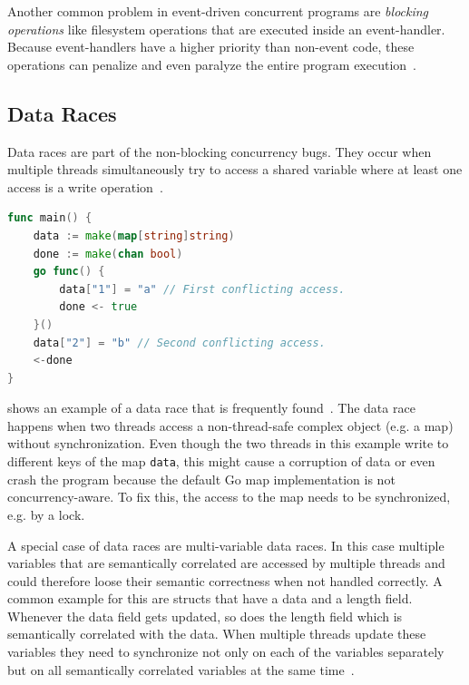 \documentclass[conference]{IEEEtran}
\begin{document}
Another common problem in event-driven concurrent programs are \emph{blocking operations} like filesystem operations that are executed inside an event-handler.
Because event-handlers have a higher priority than non-event code, these operations can penalize and even paralyze the entire program execution~\cite{tchamgoue2012testing}.

\subsection{Data Races}

Data races are part of the non-blocking concurrency bugs.
They occur when multiple threads simultaneously try to access a shared variable where at least one access is a write operation~\cite{serebry2009threadsanitizer}.

\begin{lstlisting}[float=h, language=Go, label=lst:race, caption=Data race by concurrently accessing a map]
func main() {
	data := make(map[string]string)
	done := make(chan bool)
	go func() {
		data["1"] = "a" // First conflicting access.
		done <- true
	}()
	data["2"] = "b" // Second conflicting access.
	<-done
}
\end{lstlisting}

 shows an example of a data race that is frequently found~\cite{serebry2009threadsanitizer}.
The data race happens when two threads access a non-thread-safe complex object (e.g. a map) without synchronization.
Even though the two threads in this example write to different keys of the map \lstinline{data}, this might cause a corruption of data or even crash the program because the default Go map implementation is not concurrency-aware.
To fix this, the access to the map needs to be synchronized, e.g. by a lock.

A special case of data races are multi-variable data races.
In this case multiple variables that are semantically correlated are accessed by multiple threads and could therefore loose their semantic correctness when not handled correctly.
A common example for this are structs that have a data and a length field.
Whenever the data field gets updated, so does the length field which is semantically correlated with the data.
When multiple threads update these variables they need to synchronize not only on each of the variables separately but on all semantically correlated variables at the same time~\cite{lu2007muvi}.
\end{document}
